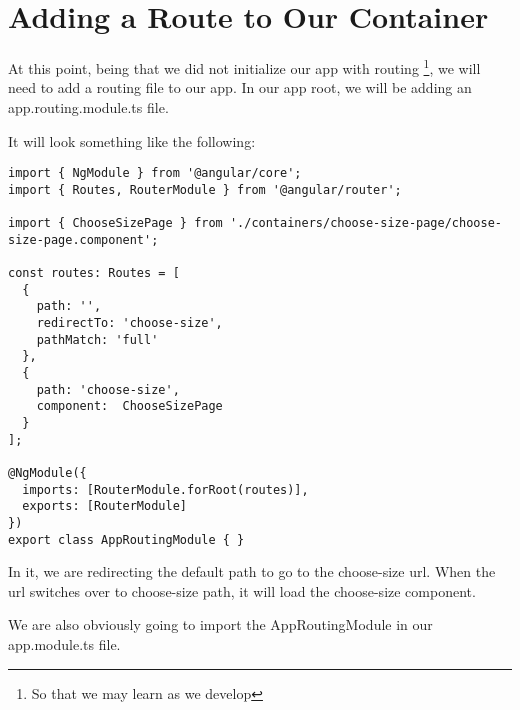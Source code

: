 \maketitle{}
\section{ Adding a Route to Our Container }

At this point, being that we did not initialize our app with routing
\footnote{So that we may learn as we develop}, we will need to add a routing
file to our app. In our app root, we will be adding an app.routing.module.ts
file.

It will look something like the following:
\begin{lstlisting}[caption=app.routing.module.ts file]
import { NgModule } from '@angular/core';
import { Routes, RouterModule } from '@angular/router';

import { ChooseSizePage } from './containers/choose-size-page/choose-size-page.component';

const routes: Routes = [
  {
    path: '',
    redirectTo: 'choose-size',
    pathMatch: 'full'
  },
  {
    path: 'choose-size',
    component:  ChooseSizePage
  }
];

@NgModule({
  imports: [RouterModule.forRoot(routes)],
  exports: [RouterModule]
})
export class AppRoutingModule { }
\end{lstlisting}

In it, we are redirecting the default path to go to the choose-size url. When
the url switches over to choose-size path, it will load the choose-size component.

We are also obviously going to import the AppRoutingModule in our app.module.ts
file.
